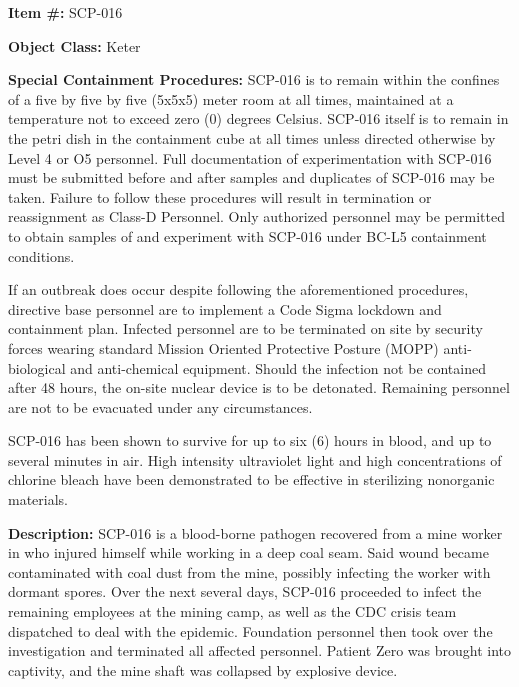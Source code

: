 
\textbf{Item \#:} SCP-016

\textbf{Object Class:} Keter

\textbf{Special Containment Procedures:} SCP-016 is to remain within the confines of a five by five by five (5x5x5) meter room at all times, maintained at a temperature not to exceed zero (0) degrees Celsius. SCP-016 itself is to remain in the petri dish in the containment cube at all times unless directed otherwise by Level 4 or O5 personnel. Full documentation of experimentation with SCP-016 must be submitted before and after samples and duplicates of SCP-016 may be taken. Failure to follow these procedures will result in termination or reassignment as Class-D Personnel. Only authorized personnel may be permitted to obtain samples of and experiment with SCP-016 under BC-L5 containment conditions.

If an outbreak does occur despite following the aforementioned procedures, directive base personnel are to implement a Code Sigma lockdown and containment plan. Infected personnel are to be terminated on site by security forces wearing standard Mission Oriented Protective Posture (MOPP) anti-biological and anti-chemical equipment. Should the infection not be contained after 48 hours, the on-site nuclear device is to be detonated. Remaining personnel are not to be evacuated under any circumstances.

SCP-016 has been shown to survive for up to six (6) hours in blood, and up to several minutes in air. High intensity ultraviolet light and high concentrations of chlorine bleach have been demonstrated to be effective in sterilizing nonorganic materials.

\textbf{Description:} SCP-016 is a blood-borne pathogen recovered from a mine worker in  who injured himself while working in a deep coal seam. Said wound became contaminated with coal dust from the mine, possibly infecting the worker with dormant spores. Over the next several days, SCP-016 proceeded to infect the remaining employees at the mining camp, as well as the CDC crisis team dispatched to deal with the epidemic. Foundation personnel then took over the investigation and terminated all affected personnel. Patient Zero was brought into captivity, and the mine shaft was collapsed by explosive device.

